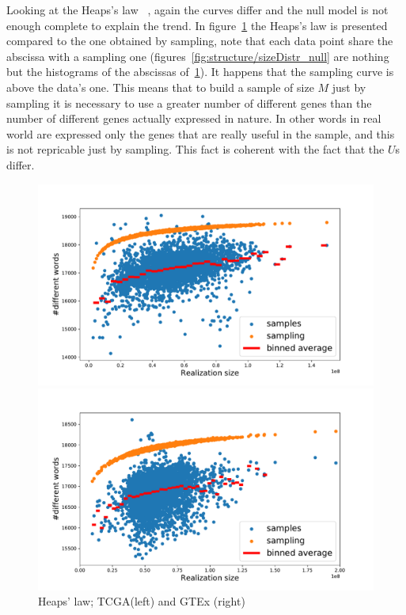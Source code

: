 Looking at the Heaps's law~\cite{Heaps:1978:IRC:539986} 
, again the curves differ and the null model is not enough complete to explain the trend. In figure~\ref{fig:structure/heaps_null} the Heaps's law is presented compared to the one obtained by sampling, note that each data point share the abscissa with a sampling one (figures~\ref{fig:structure/sizeDistr_null} are nothing but the histograms of the abscissas of~\ref{fig:structure/heaps_null}). It happens that the sampling curve is above the data's one. This means that to build a sample of size $M$ just by sampling it is necessary to use a greater number of different genes than the number of different genes actually expressed in nature. In other words in real world are expressed only the genes that are really useful in the sample, and this is not repricable just by sampling. This fact is coherent with the fact that the $U$s differ.
\begin{figure}[htb!]
\begin{minipage}{0.5\textwidth}
    \centering
    \includegraphics[width=0.95\linewidth]{pictures/structure/tcga/heaps_null.pdf}
    \end{minipage}
\hspace{2mm}
\begin{minipage}{0.5\textwidth}
    \centering
    \includegraphics[width=0.95\linewidth]{pictures/structure/gtex/heaps_null.pdf}
    \end{minipage}
\caption{Heaps' law; TCGA(left) and GTEx (right)}
\label{fig:structure/heaps_null}
\end{figure}
